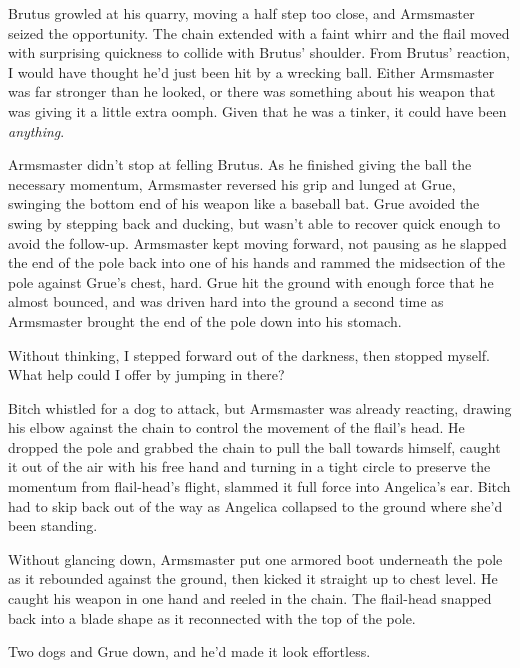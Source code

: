 Brutus growled at his quarry, moving a half step too close, and Armsmaster seized the opportunity.  The chain extended with a faint whirr and the flail moved with surprising quickness to collide with Brutus' shoulder.  From Brutus' reaction, I would have thought he'd just been hit by a wrecking ball.  Either Armsmaster was far stronger than he looked, or there was something about his weapon that was giving it a little extra oomph.  Given that he was a tinker, it could have been \emph{anything}.



Armsmaster didn't stop at felling Brutus.  As he finished giving the ball the necessary momentum, Armsmaster reversed his grip and lunged at Grue, swinging the bottom end of his weapon like a baseball bat.  Grue avoided the swing by stepping back and ducking, but wasn't able to recover quick enough to avoid the follow-up.  Armsmaster kept moving forward, not pausing as he slapped the end of the pole back into one of his hands and rammed the midsection of the pole against Grue's chest, hard.  Grue hit the ground with enough force that he almost bounced, and was driven hard into the ground a second time as Armsmaster brought the end of the pole down into his stomach.



Without thinking, I stepped forward out of the darkness, then stopped myself.  What help could I offer by jumping in there?



Bitch whistled for a dog to attack, but Armsmaster was already reacting, drawing his elbow against the chain to control the movement of the flail's head.  He dropped the pole and grabbed the chain to pull the ball towards himself, caught it out of the air with his free hand and turning in a tight circle to preserve the momentum from flail-head's flight, slammed it full force into Angelica's ear.  Bitch had to skip back out of the way as Angelica collapsed to the ground where she'd been standing.



Without glancing down, Armsmaster put one armored boot underneath the pole as it rebounded against the ground, then kicked it straight up to chest level.  He caught his weapon in one hand and reeled in the chain.  The flail-head snapped back into a blade shape as it reconnected with the top of the pole.



Two dogs and Grue down, and he'd made it look effortless.



